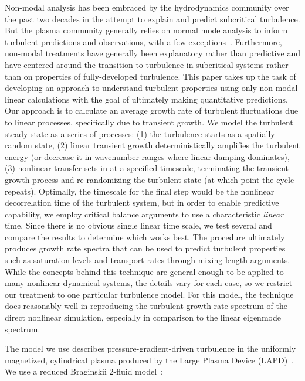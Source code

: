 \documentclass[letter,scriptaddress,twocolumn, prl,showkeys]{revtex4}
\begin{document}
Non-modal analysis has been embraced by the hydrodynamics community over the past two decades in the attempt to explain and predict subcritical turbulence. But the plasma community
generally relies on normal mode analysis to inform turbulent predictions and observations, with a few exceptions~\cite{camargo1998,camporeale2010,schekochihin2012}. 
Furthermore, non-modal treatments have generally been explanatory rather than predictive and have centered around the transition to turbulence in subcritical systems rather 
than on properties of fully-developed turbulence.
This paper takes up the task of developing an approach to understand turbulent properties using only non-modal linear calculations with the goal of 
ultimately making quantitative predictions.  Our approach is to calculate
an average growth rate of turbulent fluctuations due to linear
processes, specifically due to transient growth.  We model the
turbulent steady state as a series of processes:  (1) the turbulence starts as a spatially random state, (2) linear transient growth deterministically amplifies the turbulent energy (or
decrease it in wavenumber ranges where linear damping dominates), (3) nonlinear transfer sets in at a specified timescale, terminating the
transient growth process and re-randomizing the turbulent state (at which point the cycle repeats).    Optimally, the timescale for the final step would be the
nonlinear decorrelation time of the turbulent system, but in order to enable predictive capability, we employ critical balance
arguments to use a characteristic \emph{linear} time. Since there is no obvious single linear time scale, we test several and compare the results to determine which works best.
The procedure ultimately produces growth rate spectra that can be used
to predict turbulent properties such as saturation levels and transport rates through mixing length arguments.
While the concepts behind this technique are general enough to be applied to many nonlinear dynamical systems, the details vary for each case, 
so we restrict our treatment to one particular turbulence model. For
this model, the technique does reasonably well in reproducing the turbulent growth rate spectrum of the direct 
nonlinear simulation, especially in comparison to the linear eigenmode spectrum.

The model we use describes pressure-gradient-driven turbulence in the uniformly magnetized, cylindrical plasma
produced by the Large Plasma Device (LAPD)~\cite{gekelman1991}. 
We use a reduced Braginskii 2-fluid model~\cite{Popovich2010a,Popovich2010b,Umansky2011,friedman2012b,friedman2013}:
\end{document}
